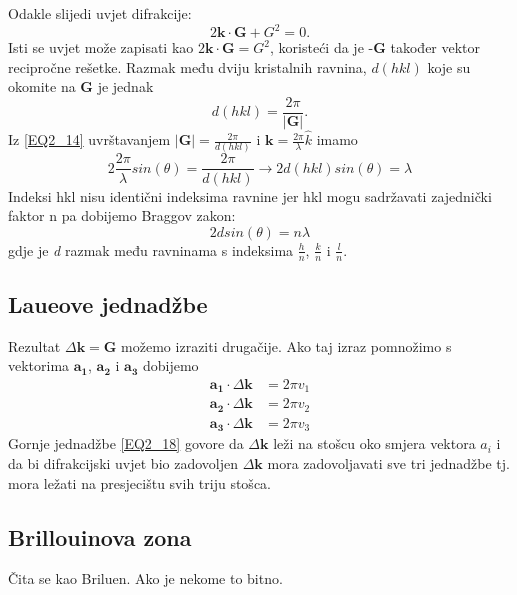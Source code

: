 \documentclass{article}
\numberwithin{equation}{section}
\begin{document}
   Odakle slijedi uvjet difrakcije:
   \begin{equation}
       2\mathbf{k\cdot G}+G^2=0.
       \label{EQ2_14}
   \end{equation}
   Isti se uvjet može zapisati kao $2\mathbf{k\cdot G}=G^2$, koristeći da je -\textbf{G} također vektor recipročne rešetke. Razmak među dviju kristalnih ravnina, $d(hkl)$ koje su okomite na \textbf{G} je jednak 
   \begin{equation}
       d(hkl)=\frac{2\pi}{\left| \mathbf{G}\right|}.
       \label{EQ2_15}
   \end{equation}
   Iz \ref{EQ2_14} uvrštavanjem $\left|\mathbf{G}\right|=\frac{2\pi}{d(hkl)}$ i $\mathbf{k}=\frac{2\pi}{\lambda} \hat{k}$ imamo 
   \begin{equation}
   2\frac{2\pi}{\lambda} sin(\theta)=\frac{2\pi}{d(hkl)} \rightarrow 2d(hkl)sin(\theta)=\lambda
       \label{EQ2_16}
   \end{equation}
   Indeksi hkl nisu identični indeksima ravnine jer hkl mogu sadržavati zajednički faktor n pa dobijemo Braggov zakon: 
   \begin{equation}
       2dsin(\theta)=n\lambda
       \label{EQ2_17}
   \end{equation}
   gdje je \textit{d} razmak među ravninama s indeksima $\frac{h}{n}$, $\frac{k}{n}$ i $\frac{l}{n}$. 
   \subsection{Laueove jednadžbe}
   Rezultat $\Delta \mathbf{k}=\mathbf{G}$ možemo izraziti drugačije. Ako taj izraz pomnožimo s vektorima $\mathbf{a_1}$, $\mathbf{a_2}$ i $\mathbf{a_3}$ dobijemo 
   \begin{equation}
   \begin{split}
       \mathbf{a_1}\cdot \Delta \mathbf{k} &= 2\pi v_1\\
       \mathbf{a_2}\cdot \Delta \mathbf{k} &= 2\pi v_2\\
       \mathbf{a_3}\cdot \Delta \mathbf{k} &= 2\pi v_3
    \end{split}
       \label{EQ2_18}
   \end{equation}
   Gornje jednadžbe \ref{EQ2_18} govore da $\Delta \mathbf{k}$ leži na stošcu oko smjera vektora $a_i$ i da bi difrakcijski uvjet bio zadovoljen $\Delta \mathbf{k}$ mora zadovoljavati sve tri jednadžbe tj. mora ležati na presjecištu svih triju stošca. 
   
\subsection{Brillouinova zona}
Čita se kao Briluen. Ako je nekome to bitno.\\
\end{document}
